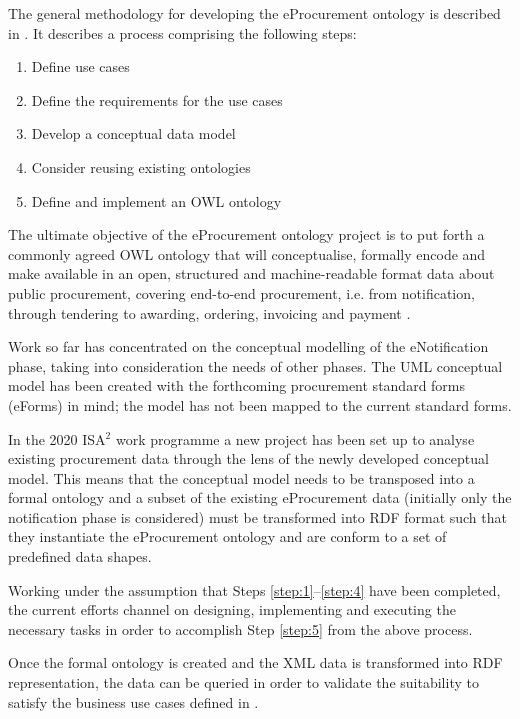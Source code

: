 	
	The general methodology for developing the eProcurement ontology is described in \cite[3--15]{d2.01-2017}. It describes a process comprising the following steps:
	\begin{enumerate}
		\item\label{step:1} Define use cases
		\item\label{step:2} Define the requirements for the use cases
		\item\label{step:3} Develop a conceptual data model
		\item\label{step:4} Consider reusing existing ontologies
		\item\label{step:5} Define and implement an OWL ontology		
	\end{enumerate}
	
	The ultimate objective of the eProcurement ontology project is to put forth a commonly agreed OWL ontology that will conceptualise, formally encode and make available in an open, structured and machine-readable format data about public procurement, covering end-to-end procurement, i.e. from notification, through tendering to awarding, ordering, invoicing and payment \citep{d4.07-2016}.
	
	Work so far has concentrated on the conceptual modelling of the eNotification phase, taking into consideration the needs of other phases. The UML conceptual model has been created with the forthcoming procurement standard forms (eForms) in mind; the model has not been mapped to the current standard forms.
	
	In the 2020 ISA$^2$ work programme a new project has been set up to analyse existing procurement data through the lens of the newly developed conceptual model. This means that the conceptual model needs to be transposed into a formal ontology and a subset of the existing eProcurement data (initially only the notification phase is considered) must be transformed into RDF format such that they instantiate the eProcurement ontology and are conform to a set of predefined data shapes.
	
	Working under the assumption that Steps \ref{step:1}--\ref{step:4} have been completed, the current efforts channel on designing, implementing and executing the necessary tasks in order to accomplish Step \ref{step:5} from the above process. 
	
	Once the formal ontology is created and the XML data is transformed into RDF representation, the data can be queried in order to validate the suitability to satisfy the business use cases defined in \cite[Sec. 3]{d2.01-2017}.
	
